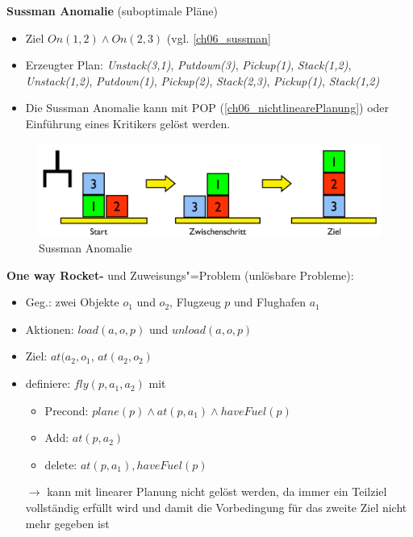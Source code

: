 \textbf{Sussman Anomalie} (suboptimale Pläne)
\begin{itemize}
	\item Ziel $On(1,2) \wedge On(2,3)$ (vgl. \autoref{ch06_sussman}
	\item Erzeugter Plan: \emph{Unstack(3,1)}, \emph{Putdown(3)}, \emph{Pickup(1)}, \emph{Stack(1,2)}, \emph{Unstack(1,2)}, \emph{Putdown(1)}, \emph{Pickup(2)}, \emph{Stack(2,3)}, \emph{Pickup(1)}, \emph{Stack(1,2)}
	\item Die Sussman Anomalie kann mit POP (\autoref{ch06_nichtlinearePlanung}) oder Einführung eines Kritikers gelöst werden.
\end{itemize}

\begin{figure}[ht]\centering 
\includegraphics[width=\textwidth]{figures/ch06_sussman.png}
\caption{Sussman Anomalie}
\label{ch06_sussman}
\end{figure}

\textbf{One way Rocket-} und Zuweisungs"=Problem (unlösbare Probleme):
\begin{itemize}
	\item Geg.: zwei Objekte $o_1$ und $o_2$, Flugzeug $p$ und Flughafen $a_1$
	\item Aktionen: $load(a,o,p)$ und $unload(a,o,p)$
	\item Ziel: $at(a_2, o_1$, $at(a_2, o_2)$
	\item definiere: $fly(p,a_1,a_2)$ mit
	\begin{itemize}
		\item Precond: $plane(p) \wedge at(p,a_1) \wedge haveFuel(p)$
		\item Add: $at(p,a_2)$
		\item delete: $at(p,a_1), haveFuel(p)$
	\end{itemize}
	\item[$\rightarrow$] kann mit linearer Planung nicht gelöst werden, da immer ein Teilziel vollständig erfüllt wird und damit die Vorbedingung für das zweite Ziel nicht mehr gegeben ist
\end{itemize}


